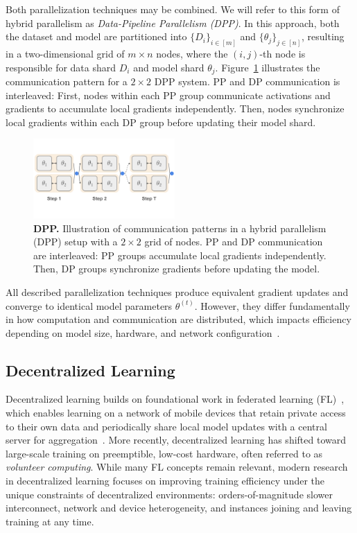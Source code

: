 \documentclass{article}
\begin{document}
Both parallelization techniques may be combined. We will refer to this form of hybrid parallelism as \textit{Data-Pipeline Parallelism (DPP)}. In this approach, both the dataset and model are partitioned into $\{D_i\}_{i \in [m]}$ and $\{\theta_j\}_{j \in [n]}$, resulting in a two-dimensional grid of $m \times n$ nodes, where the $(i,j)$-th node is responsible for data shard $D_i$ and model shard $\theta_j$. Figure~\ref{fig:dpp} illustrates the communication pattern for a $2\times 2$ DPP system. PP and DP communication is interleaved: First, nodes within each PP group communicate activations and gradients to accumulate local gradients independently. Then, nodes synchronize local gradients within each DP group before updating their model shard.

\begin{figure}[ht]
    \centering
    \vspace{0.5cm}
    \includegraphics[width=0.48\textwidth]{figures/dpp.pdf}
    \caption{\textbf{DPP.} Illustration of communication patterns in a hybrid parallelism (DPP) setup with a $2 \times 2$ grid of nodes. PP and DP communication are interleaved: PP groups accumulate local gradients independently. Then, DP groups synchronize gradients before updating the model.}
    \label{fig:dpp}
\end{figure}

All described parallelization techniques produce equivalent gradient updates and converge to identical model parameters $\theta^{(t)}$. However, they differ fundamentally in how computation and communication are distributed, which impacts efficiency depending on model size, hardware, and network configuration~\cite{hagemann2024parallelization, fernandez2024scalingtrends}.

\subsection{Decentralized Learning}

Decentralized learning builds on foundational work in federated learning (FL)~\cite{mcmahan2016fl}, which enables learning on a network
of mobile devices that retain private access to their own data and periodically share local model updates with a central server for aggregation~\cite{mcmahan2016fl,wang2020fedma}. More recently, decentralized learning has shifted toward large-scale training on preemptible, low-cost hardware, often referred to as \textit{volunteer computing}. While many FL concepts remain relevant, modern research in decentralized learning focuses on improving training efficiency under the unique constraints of decentralized environments: orders-of-magnitude slower interconnect, network and device heterogeneity, and instances joining and leaving training at any time.
\end{document}
